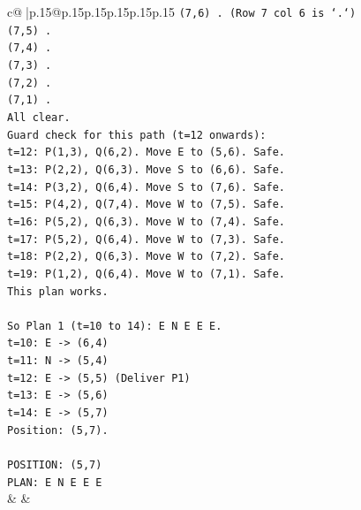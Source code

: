 \documentclass{article}
\begin{document}
{\begin{supertabular}{c@{$\;$}|p{.15\linewidth}@{}p{.15\linewidth}p{.15\linewidth}p{.15\linewidth}p{.15\linewidth}p{.15\linewidth}}
{{{\texttt{(7,6) . (Row 7 col 6 is `.`)} \\
\texttt{(7,5) .} \\
\texttt{(7,4) .} \\
\texttt{(7,3) .} \\
\texttt{(7,2) .} \\
\texttt{(7,1) .} \\
\texttt{All clear.} \\
\texttt{Guard check for this path (t=12 onwards):} \\
\texttt{t=12: P(1,3), Q(6,2). Move E to (5,6). Safe.} \\
\texttt{t=13: P(2,2), Q(6,3). Move S to (6,6). Safe.} \\
\texttt{t=14: P(3,2), Q(6,4). Move S to (7,6). Safe.} \\
\texttt{t=15: P(4,2), Q(7,4). Move W to (7,5). Safe.} \\
\texttt{t=16: P(5,2), Q(6,3). Move W to (7,4). Safe.} \\
\texttt{t=17: P(5,2), Q(6,4). Move W to (7,3). Safe.} \\
\texttt{t=18: P(2,2), Q(6,3). Move W to (7,2). Safe.} \\
\texttt{t=19: P(1,2), Q(6,4). Move W to (7,1). Safe.} \\
\texttt{This plan works.} \\
\\ 
\texttt{So Plan 1 (t=10 to 14): E N E E E.} \\
\texttt{t=10: E {-}> (6,4)} \\
\texttt{t=11: N {-}> (5,4)} \\
\texttt{t=12: E {-}> (5,5) (Deliver P1)} \\
\texttt{t=13: E {-}> (5,6)} \\
\texttt{t=14: E {-}> (5,7)} \\
\texttt{Position: (5,7).} \\
\\ 
\texttt{POSITION: (5,7)} \\
\texttt{PLAN: E N E E E} \\
            }
        }
    }
    & & \\ \\


\end{supertabular}}
\end{document}

